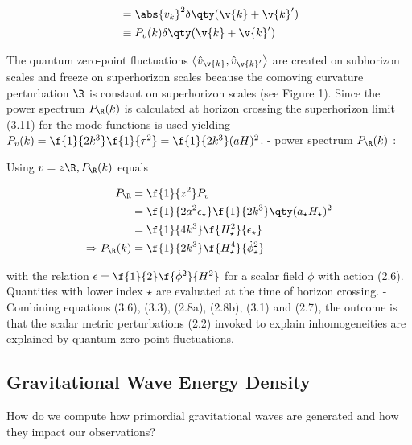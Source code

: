 \[
\begin{aligned}
& =\abs{v_k}^2 \delta\qty(\v{k}+\v{k}^{\prime}) \\
& \equiv P_v(k) \delta\qty(\v{k}+\v{k}^{\prime})
\end{aligned}
\]


The quantum zero-point fluctuations $\left\langle\hat{v}_{\v{k}}, \hat{v}_{\v{k}^{\prime}}\right\rangle$ are created on subhorizon scales and freeze on superhorizon scales because the comoving curvature perturbation $\R $ is constant on superhorizon scales (see Figure 1). Since the power spectrum $P_{\R }(k)$ is calculated at horizon crossing the superhorizon limit (3.11) for the mode functions is used yielding $P_v(k)=\f{1}{2 k^3} \f{1}{\tau^2}=\f{1}{2 k^3}(a H)^2$.
- power spectrum $P_{\R }(k)$ :

Using $v=z \R , P_{\R }(k)$ equals

\[
\begin{aligned}
P_{\R } & =\f{1}{z^2} P_v \\
& =\f{1}{2 a^2 \epsilon_{\star}} \f{1}{2 k^3}\qty(a_{\star} H_{\star})^2 \\
& =\f{1}{4 k^3} \f{H_{\star}^2}{\epsilon_{\star}} \\
\Rightarrow P_{\R }(k) & =\f{1}{2 k^3} \f{H_{\star}^4}{\dot{\phi}_{\star}^2}
\end{aligned}
\]

with the relation $\epsilon=\f{1}{2} \f{\dot{\phi}^2}{H^2}$ for a scalar field $\phi$ with action (2.6). Quantities with lower index $\star$ are evaluated at the time of horizon crossing.
- Combining equations (3.6), (3.3), (2.8a), (2.8b), (3.1) and (2.7), the outcome is that the scalar metric perturbations (2.2) invoked to explain inhomogeneities are explained by quantum zero-point fluctuations.




\subsection{Gravitational Wave Energy Density}
How do we compute how primordial gravitational waves are generated and how they impact our observations?


